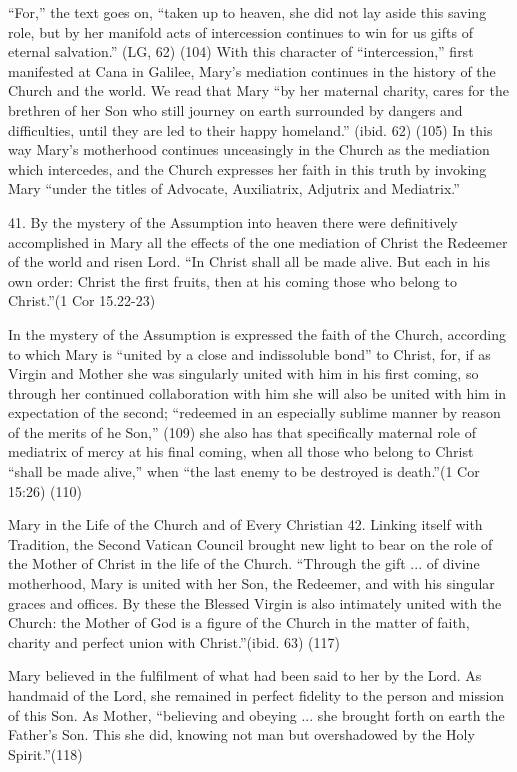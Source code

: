 \documentclass[oneside]{book}
\begin{document}
``For,'' the text goes on, ``taken up to heaven, she did not lay aside this
saving role, but by her manifold acts of intercession continues to win for us
gifts of eternal salvation.'' (LG, 62) (104) With this character of
``intercession,'' first manifested at Cana in Galilee, Mary's mediation
continues in the history of the Church and the world. We read that Mary ``by her
maternal charity, cares for the brethren of her Son who still journey on earth
surrounded by dangers and difficulties, until they are led to their happy
homeland.'' (ibid. 62) (105)  In this way Mary's motherhood continues
unceasingly in the Church as the mediation which intercedes, and the Church
expresses her faith in this truth by invoking Mary ``under the titles of
Advocate, Auxiliatrix, Adjutrix and Mediatrix.''

41. By the mystery of the Assumption into heaven there were definitively
accomplished in Mary all the effects of the one mediation of Christ the Redeemer
of the world and risen Lord. ``In Christ shall all be made alive. But each in
his own order: Christ the first fruits, then at his coming those who belong to
Christ.''(1 Cor 15.22-23)

In the mystery of the Assumption is expressed the faith of the Church, according
to which Mary is ``united by a close and indissoluble bond'' to Christ, for, if
as Virgin and Mother she was singularly united with him in his first coming, so
through her continued collaboration with him she will also be united with him in
expectation of the second; ``redeemed in an especially sublime manner by reason
of the merits of he Son,'' (109) she also has that specifically maternal role of
mediatrix of mercy at his final coming, when all those who belong to Christ
``shall be made alive,'' when ``the last enemy to be destroyed is death.''(1
Cor 15:26) (110)

Mary in the Life of the Church and of Every Christian
42. Linking itself with Tradition, the Second Vatican Council brought new light
to bear on the role of the Mother of Christ in the life of the Church. ``Through
the gift ... of divine motherhood, Mary is united with her Son, the Redeemer,
and with his singular graces and offices. By these the Blessed Virgin is also
intimately united with the Church: the Mother of God is a figure of the Church
in the matter of faith, charity and perfect union with Christ.''(ibid. 63) (117)

Mary believed in the fulfilment of what had been said to her by the Lord. As
handmaid of the Lord, she remained in perfect fidelity to the person and mission
of this Son. As Mother, ``believing and obeying ... she brought forth on earth
the Father's Son. This she did, knowing not man but overshadowed by the Holy
Spirit.''(118)
\end{document}
